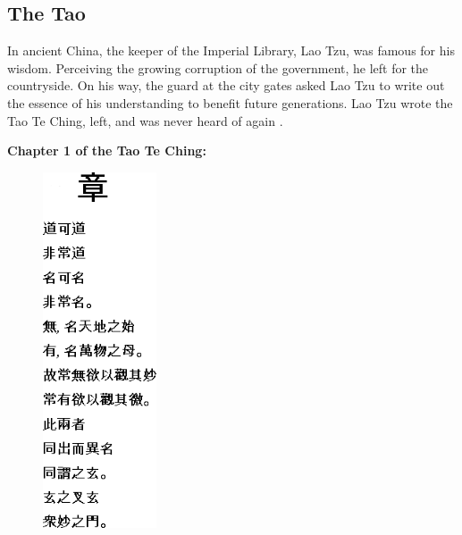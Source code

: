 \documentclass[11pt]{article}
\begin{document}
\subsection{The Tao}

In ancient China, the keeper of the Imperial Library, Lao Tzu, was famous for his wisdom. Perceiving the growing corruption of the government, he left for the countryside. On his way, the guard at the city gates asked Lao Tzu to write out the essence of his understanding to benefit future generations. Lao Tzu wrote the Tao Te Ching, left, and was never heard of again \cite{tao_introduction}.

\medskip
\begin{center}
\textbf{\cite{tao_chapter1} Chapter 1 of the Tao Te Ching:}
\end{center}

\begin{figure}
    \centering
    \vspace{-49pt}
    \includegraphics[width=0.30\textwidth]{tao.png}
\end{figure}
\end{document}
